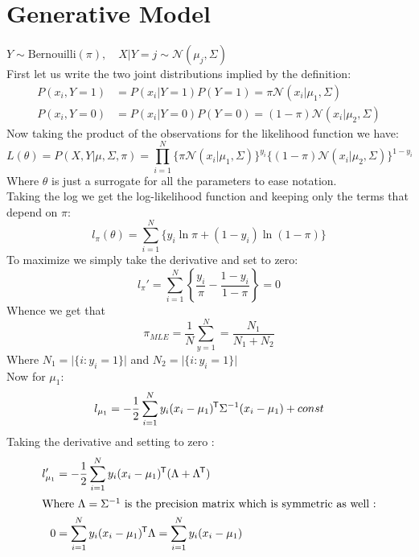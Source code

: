 


\newcommand{\No}{\mathcal{N}}

\section{Generative Model}
$Y \sim \mathrm{Bernouilli}(\pi), \quad X\vert Y = j \sim \mathcal N (\mu_j, \Sigma)$\\[1ex]
First let us write the two joint distributions implied by the definition:
\begin{align*}
    P(x_i, Y = 1) &= P(x_i \vert Y = 1)P(Y=1) = \pi\No(x_i \vert \mu_1, \Sigma)\\
    P(x_i ,Y = 0) &= P(x_i \vert Y = 0)P(Y=0) = (1-\pi) \No (x_i \vert \mu_2, \Sigma)
\end{align*}
Now taking the product of the observations for the likelihood function we have:
\begin{equation}
    L(\theta) =  P(X, Y \vert \mu, \Sigma , \pi) = \prod_{i=1}^{N}
    	\{\pi\No (x_i \vert \mu_1, \Sigma)\}^{y_i}
	\{(1-\pi)\No (x_i \vert \mu_2, \Sigma)\}^{1-y_i}
\end{equation}
Where $\theta$ is just a surrogate for all the parameters to ease notation.\\
Taking the log we get the log-likelihood function and keeping only the terms 
that depend on $\pi$:
\begin{equation}
l_\pi (\theta) = \sum_{i=1}^{N}\{y_i\ln \pi + (1-y_i)\ln (1-\pi) \}
\end{equation}
To maximize we simply take the derivative and set to zero:
\begin{equation}
l_\pi ' = \sum_{i=1}^{N}\left \{\frac{y_i}{\pi}  - \frac{1-y_i}{1-\pi}\right \}  = 0
\end{equation}
Whence we get that 
\begin{equation}
\pi_{MLE} = \frac{1}{N}\sum_{y=1}^N = \frac{N_1}{N_1 + N_2}
\end{equation}
Where $N_1 = \vert \{i : y_i = 1\}\vert$ and $N_2 = \vert \{i : y_i = 1\}\vert$\\
Now for $\mu_1$:
\begin{equation}
    l_{\mu_1} = -\frac{1}{2}\sum_{i=1}^N y_i (x_i - \mu_1)^{\mkern-1.5mu\mathsf{T}} \Sigma^{-1}(x_i
    - \mu_1) + const 
\end{equation}
Taking the derivative and setting to zero :
\begin{align*}
    l_{\mu_1}' &= -\frac{1}{2} \sum_{i=1}^N y_i (x_i-\mu_1)^{\mkern-1.5mu\mathsf{T}}(\Lambda + \Lambda^{\mkern-1.5mu\mathsf{T}})\\
    \intertext{Where $\Lambda = \Sigma^{-1}$ is the precision matrix which is symmetric
    as well :}
    0 &= \sum_{i=1}^N y_i (x_i-\mu_1)^{\mkern-1.5mu\mathsf{T}} \Lambda 
        =\sum_{i=1}^N y_i (x_i-\mu_1)
\end{align*}

